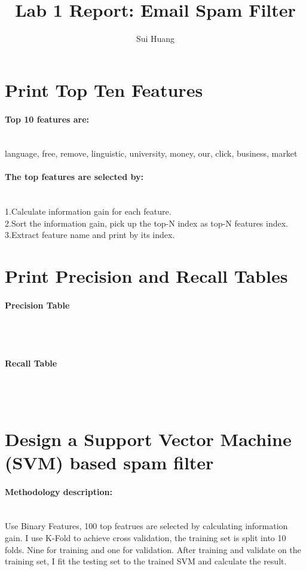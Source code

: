 \documentclass{article}
\begin{document}
\author{Sui Huang}
\title{Lab 1 Report: Email Spam Filter}
\maketitle

\section{Print Top Ten Features}
\paragraph{Top 10 features are:} \mbox{}\\
language, free, remove, linguistic, university, money, our, click, business, market 
\paragraph{The top features are selected by:}\mbox{}\\
1.Calculate information gain for each feature.\\
2.Sort the information gain, pick up the top-N index as top-N features index.\\
3.Extract feature name and print by its index.\\

\section{Print Precision and Recall Tables}
\paragraph{Precision Table}\mbox{}\\
\\
\paragraph{Recall Table}\mbox{}\\
\\

\section{Design a Support Vector Machine (SVM) based spam filter}
\paragraph{Methodology description:} \mbox{}\\Use Binary Features, 100 top featrues are selected by calculating information gain. I use K-Fold to achieve cross validation, the training set is split into 10 folds. Nine for training and one for validation. After training and validate on the training set, I fit the testing set to the trained SVM and calculate the result.
\end{document}
